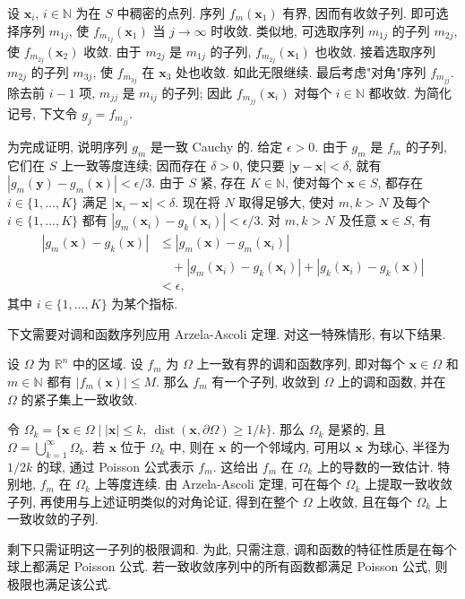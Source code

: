 \begin{Proof}
设 $\bm{x}_i$, $i\in\mathbb{N}$ 为在 $S$ 中稠密的点列. 序列 $f_m(\bm{x}_1)$ 有界, 因而有收敛子列. 即可选择序列 $m_{1j}$, 使 $f_{m_{1j}}(\bm{x}_1)$ 当 $j\to\infty$ 时收敛. 类似地, 可选取序列 $m_{1j}$ 的子列 $m_{2j}$, 使 $f_{m_{2j}}(\bm{x}_2)$ 收敛. 由于 $m_{2j}$ 是 $m_{1j}$ 的子列, $f_{m_{2j}}(\bm{x}_1)$ 也收敛. 接着选取序列 $m_{2j}$ 的子列 $m_{3j}$, 使 $f_{m_{3j}}$ 在 $\bm{x}_3$ 处也收敛. 如此无限继续. 最后考虑"对角"序列 $f_{m_{jj}}$. 除去前 $i-1$ 项, $m_{jj}$ 是 $m_{ij}$ 的子列; 因此 $f_{m_{jj}}(\bm{x}_i)$ 对每个 $i\in\mathbb{N}$ 都收敛. 为简化记号, 下文令 $g_j=f_{m_{jj}}$.

为完成证明, 说明序列 $g_m$ 是一致 Cauchy 的. 给定 $\epsilon>0$. 由于 $g_m$ 是 $f_m$ 的子列, 它们在 $S$ 上一致等度连续; 因而存在 $\delta>0$, 使只要 $|\bm{y}-\bm{x}|<\delta$, 就有 $|g_m(\bm{y})-g_m(\bm{x})|<\epsilon/3$. 由于 $S$ 紧, 存在 $K\in\mathbb{N}$, 使对每个 $\bm{x}\in S$, 都存在 $i\in\{1,\ldots,K\}$ 满足 $|\bm{x}_i-\bm{x}|<\delta$. 现在将 $N$ 取得足够大, 使对 $m,k>N$ 及每个 $i\in\{1,\ldots,K\}$ 都有 $|g_m(\bm{x}_i)-g_k(\bm{x}_i)|<\epsilon/3$. 对 $m,k>N$ 及任意 $\bm{x}\in S$, 有
\begin{equation}\label{eq:arzela-ascoli-uniform-cauchy-estimate}
\begin{aligned}
|g_m(\bm{x})-g_k(\bm{x})|
&\leq|g_m(\bm{x})-g_m(\bm{x}_i)|\\
&\quad+|g_m(\bm{x}_i)-g_k(\bm{x}_i)|+|g_k(\bm{x}_i)-g_k(\bm{x})|\\
&<\epsilon,
\end{aligned}
\end{equation}
其中 $i\in\{1,\ldots,K\}$ 为某个指标.
\end{Proof}

下文需要对调和函数序列应用 Arzela-Ascoli 定理. 对这一特殊情形, 有以下结果.

\begin{Theorem}
\label{thm:harmonic-sequence-compactness}
设 $\Omega$ 为 $\mathbb{R}^n$ 中的区域. 设 $f_m$ 为 $\Omega$ 上一致有界的调和函数序列, 即对每个 $\bm{x}\in\Omega$ 和 $m\in\mathbb{N}$ 都有 $|f_m(\bm{x})|\leq M$. 那么 $f_m$ 有一个子列, 收敛到 $\Omega$ 上的调和函数, 并在 $\Omega$ 的紧子集上一致收敛.
\end{Theorem}

\begin{Proof}
令 $\Omega_k=\{\bm{x}\in\Omega\mid|\bm{x}|\leq k,\ \operatorname{dist}(\bm{x},\partial\Omega)\geq1/k\}$. 那么 $\Omega_k$ 是紧的, 且 $\Omega=\bigcup_{k=1}^\infty\Omega_k$. 若 $\bm{x}$ 位于 $\Omega_k$ 中, 则在 $\bm{x}$ 的一个邻域内, 可用以 $\bm{x}$ 为球心, 半径为 $1/2k$ 的球, 通过 Poisson 公式表示 $f_m$. 这给出 $f_m$ 在 $\Omega_k$ 上的导数的一致估计. 特别地, $f_m$ 在 $\Omega_k$ 上等度连续. 由 Arzela-Ascoli 定理, 可在每个 $\Omega_k$ 上提取一致收敛子列, 再使用与上述证明类似的对角论证, 得到在整个 $\Omega$ 上收敛, 且在每个 $\Omega_k$ 上一致收敛的子列.

剩下只需证明这一子列的极限调和. 为此, 只需注意, 调和函数的特征性质是在每个球上都满足 Poisson 公式. 若一致收敛序列中的所有函数都满足 Poisson 公式, 则极限也满足该公式.
\end{Proof}

